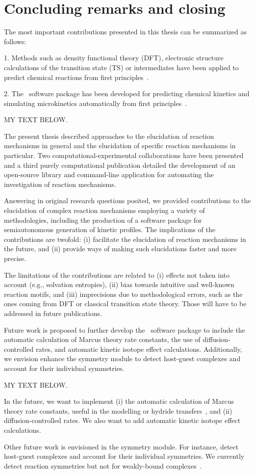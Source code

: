 \chapter{Concluding remarks and closing}%
\label{ch:conclusion}

The most important contributions presented in this thesis can be summarized as follows:

1. Methods such as density functional theory (DFT), electronic structure calculations of the transition state (TS) or intermediates have been applied to predict chemical reactions from first principles~\cite{Coelho_2019,Oliveira_2020}.

2. The \overreact~software package has been developed for predicting chemical kinetics and simulating microkinetics automatically from first principles~\cite{Schneider2022}.

MY TEXT BELOW.

The present thesis described approaches to the elucidation of reaction
mechanisms in general and the elucidation of specific reaction mechanisms in
particular.
Two computational-experimental collaborations have been presented and a third
purely computational publication detailed the development of an open-source
library and command-line application for automating the investigation of
reaction mechanisms.

Answering in original research questions posited, we provided contributions
to the elucidation of complex reaction mechanisms employing a variety of methodologies,
including the production of a software package for semiautonomous generation of kinetic profiles.
The implications of the contributions are twofold:
(i) facilitate the elucidation of reaction mechanisms in the future, and
(ii) provide ways of making such elucidations faster and more precise.

The limitations of the contributions are related to
(i) effects not taken into account (e.g., solvation entropies),
(ii) bias towards intuitive and well-known reaction motifs, and
(iii) imprecisions due to methodological errors, such as the ones coming from DFT or classical transition state theory.
Those will have to be addressed in future publications.

Future work is proposed to further develop the \overreact~software package to include the automatic calculation of Marcus theory rate constants,
the use of diffusion-controlled rates,
and automatic kinetic isotope effect calculations.
Additionally, we envision enhance the symmetry module to detect host-guest complexes
and account for their individual symmetries.

MY TEXT BELOW.

In the future, we want to implement (i) the automatic calculation of Marcus theory rate constants,
useful in the modelling or hydride transfers~\cite{Nikbin_2012},
and (ii) diffusion-controlled rates.
We also want to add automatic kinetic isotope effect calculations.

Other future work is envisioned in the symmetry module.
For instance, detect host-guest complexes and account for their individual symmetries.
We currently detect reaction symmetries but not for weakly-bound complexes~\cite{Gilson_2010}.

